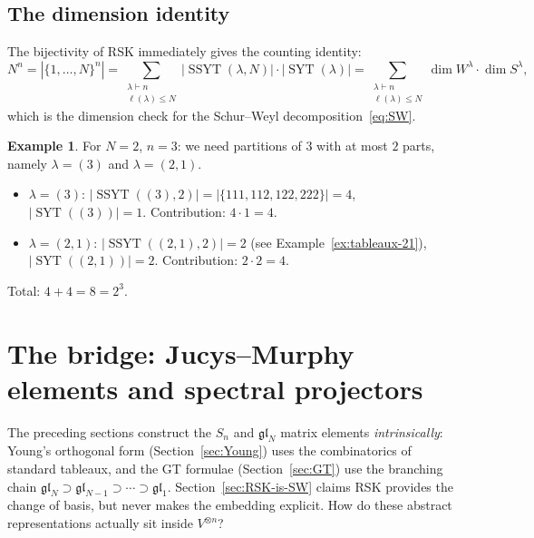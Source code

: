 \documentclass[12pt,a4paper]{article}
\theoremstyle{definition}
\newtheorem{example}[theorem]{Example}
\theoremstyle{remark}
\newcommand{\gl}{\mathfrak{gl}}
\newcommand{\SYT}{\operatorname{SYT}}
\newcommand{\SSYT}{\operatorname{SSYT}}
\begin{document}
\subsection{The dimension identity}

The bijectivity of RSK immediately gives the counting identity:
\begin{equation}\label{eq:dim-count}
  N^n
  = |\{1,\ldots,N\}^n|
  = \sum_{\substack{\lambda \vdash n \\ \ell(\lambda) \leqslant N}}
    |\SSYT(\lambda, N)| \cdot |\SYT(\lambda)|
  = \sum_{\substack{\lambda \vdash n \\ \ell(\lambda) \leqslant N}}
    \dim W^\lambda \cdot \dim S^\lambda,
\end{equation}
which is the dimension check for the Schur--Weyl
decomposition~\eqref{eq:SW}.

\begin{example}
For $N = 2$, $n = 3$: we need partitions of $3$ with at most $2$
parts, namely $\lambda = (3)$ and $\lambda = (2,1)$.
\begin{itemize}
\item $\lambda = (3)$: $|\SSYT((3), 2)| = |\{111, 112, 122, 222\}| = 4$,
  $|\SYT((3))| = 1$. Contribution: $4 \cdot 1 = 4$.
\item $\lambda = (2,1)$: $|\SSYT((2,1), 2)| = 2$ (see
  Example~\ref{ex:tableaux-21}), $|\SYT((2,1))| = 2$.
  Contribution: $2 \cdot 2 = 4$.
\end{itemize}
Total: $4 + 4 = 8 = 2^3$. \checkmark
\end{example}

\section{The bridge: Jucys--Murphy elements and spectral projectors}
\label{sec:bridge}

The preceding sections construct the $S_n$ and $\gl_N$ matrix elements
\emph{intrinsically}: Young's orthogonal form
(Section~\ref{sec:Young}) uses the combinatorics of standard tableaux,
and the GT formulae (Section~\ref{sec:GT}) use the branching chain
$\gl_N \supset \gl_{N-1} \supset \cdots \supset \gl_1$.
Section~\ref{sec:RSK-is-SW} claims RSK provides the change of basis,
but never makes the embedding explicit. How do these abstract
representations actually sit inside $V^{\otimes n}$?
\end{document}
